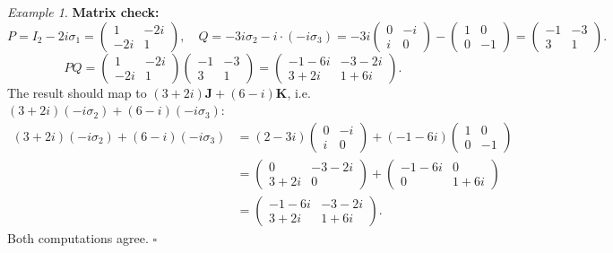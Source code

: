 \documentclass[12pt,a4paper]{article}
\theoremstyle{definition}
\theoremstyle{remark}
\newtheorem{example}[theorem]{Example}
\begin{document}
\begin{example}
  \noindent\textbf{Matrix check:}
  \[
    P = I_2 - 2i\sigma_1
      = \begin{pmatrix}1&-2i\\-2i&1\end{pmatrix},
    \quad
    Q = -3i\sigma_2 - i\cdot(-i\sigma_3)
      = -3i\begin{pmatrix}0&-i\\i&0\end{pmatrix}
        -\begin{pmatrix}1&0\\0&-1\end{pmatrix}
      = \begin{pmatrix}-1&-3\\3&1\end{pmatrix}.
      \]
  \[
    PQ = \begin{pmatrix}1&-2i\\-2i&1\end{pmatrix}
         \begin{pmatrix}-1&-3\\3&1\end{pmatrix}
       = \begin{pmatrix}-1-6i & -3-2i \\ 3+2i & 1+6i\end{pmatrix}.
  \]
  The result should map to $(3+2i)\mathbf{J}+(6-i)\mathbf{K}$, i.e.\
  $(3+2i)(-i\sigma_2) + (6-i)(-i\sigma_3)$:
  \begin{align*}
    (3+2i)(-i\sigma_2) + (6-i)(-i\sigma_3)
    &= (2-3i)\begin{pmatrix}0&-i\\i&0\end{pmatrix}
      +(-1-6i)\begin{pmatrix}1&0\\0&-1\end{pmatrix} \\
    &= \begin{pmatrix}0&-3-2i\\3+2i&0\end{pmatrix}
      +\begin{pmatrix}-1-6i&0\\0&1+6i\end{pmatrix} \\
    &= \begin{pmatrix}-1-6i & -3-2i \\ 3+2i & 1+6i\end{pmatrix}.
  \end{align*}
  Both computations agree. \hfill$\square$
\end{example}
\end{document}
